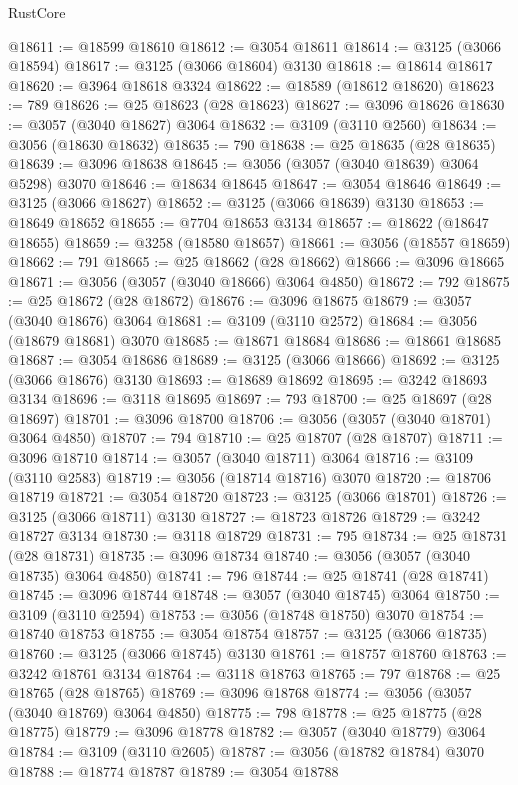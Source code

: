 \begin{lexlean}{RustCore}
\begin{coremodule}
@18611 := @18599 @18610
@18612 := @3054 @18611
@18614 := @3125 (@3066 @18594)
@18617 := @3125 (@3066 @18604) @3130
@18618 := @18614 @18617
@18620 := @3964 @18618 @3324
@18622 := @18589 (@18612 @18620)
@18623 := 789
@18626 := @25 @18623 (@28 @18623)
@18627 := @3096 @18626
@18630 := @3057 (@3040 @18627) @3064
@18632 := @3109 (@3110 @2560)
@18634 := @3056 (@18630 @18632)
@18635 := 790
@18638 := @25 @18635 (@28 @18635)
@18639 := @3096 @18638
@18645 := @3056 (@3057 (@3040 @18639) @3064 @5298) @3070
@18646 := @18634 @18645
@18647 := @3054 @18646
@18649 := @3125 (@3066 @18627)
@18652 := @3125 (@3066 @18639) @3130
@18653 := @18649 @18652
@18655 := @7704 @18653 @3134
@18657 := @18622 (@18647 @18655)
@18659 := @3258 (@18580 @18657)
@18661 := @3056 (@18557 @18659)
@18662 := 791
@18665 := @25 @18662 (@28 @18662)
@18666 := @3096 @18665
@18671 := @3056 (@3057 (@3040 @18666) @3064 @4850)
@18672 := 792
@18675 := @25 @18672 (@28 @18672)
@18676 := @3096 @18675
@18679 := @3057 (@3040 @18676) @3064
@18681 := @3109 (@3110 @2572)
@18684 := @3056 (@18679 @18681) @3070
@18685 := @18671 @18684
@18686 := @18661 @18685
@18687 := @3054 @18686
@18689 := @3125 (@3066 @18666)
@18692 := @3125 (@3066 @18676) @3130
@18693 := @18689 @18692
@18695 := @3242 @18693 @3134
@18696 := @3118 @18695
@18697 := 793
@18700 := @25 @18697 (@28 @18697)
@18701 := @3096 @18700
@18706 := @3056 (@3057 (@3040 @18701) @3064 @4850)
@18707 := 794
@18710 := @25 @18707 (@28 @18707)
@18711 := @3096 @18710
@18714 := @3057 (@3040 @18711) @3064
@18716 := @3109 (@3110 @2583)
@18719 := @3056 (@18714 @18716) @3070
@18720 := @18706 @18719
@18721 := @3054 @18720
@18723 := @3125 (@3066 @18701)
@18726 := @3125 (@3066 @18711) @3130
@18727 := @18723 @18726
@18729 := @3242 @18727 @3134
@18730 := @3118 @18729
@18731 := 795
@18734 := @25 @18731 (@28 @18731)
@18735 := @3096 @18734
@18740 := @3056 (@3057 (@3040 @18735) @3064 @4850)
@18741 := 796
@18744 := @25 @18741 (@28 @18741)
@18745 := @3096 @18744
@18748 := @3057 (@3040 @18745) @3064
@18750 := @3109 (@3110 @2594)
@18753 := @3056 (@18748 @18750) @3070
@18754 := @18740 @18753
@18755 := @3054 @18754
@18757 := @3125 (@3066 @18735)
@18760 := @3125 (@3066 @18745) @3130
@18761 := @18757 @18760
@18763 := @3242 @18761 @3134
@18764 := @3118 @18763
@18765 := 797
@18768 := @25 @18765 (@28 @18765)
@18769 := @3096 @18768
@18774 := @3056 (@3057 (@3040 @18769) @3064 @4850)
@18775 := 798
@18778 := @25 @18775 (@28 @18775)
@18779 := @3096 @18778
@18782 := @3057 (@3040 @18779) @3064
@18784 := @3109 (@3110 @2605)
@18787 := @3056 (@18782 @18784) @3070
@18788 := @18774 @18787
@18789 := @3054 @18788

\end{coremodule}
\end{lexlean}
